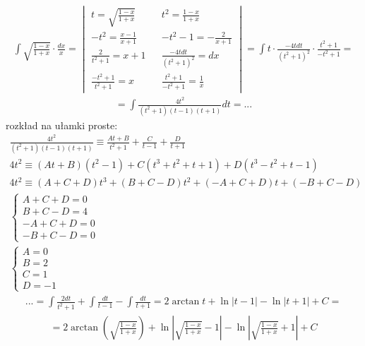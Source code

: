 
\begin{gather*}\int \sqrt{\frac{1-x}{1+x}}\cdot\frac{dx}{x} = \begin{vmatrix}
t=\sqrt{\frac{1-x}{1+x}} & & t^2=\frac{1-x}{1+x} \\
-t^2=\frac{x-1}{x+1} & & -t^2-1=-\frac{2}{x+1} \\
\frac{2}{t^2+1}=x+1 & & \frac{-4tdt}{(t^2+1)^2}=dx \\
\frac{-t^2+1}{t^2+1}=x & & \frac{t^2+1}{-t^2+1}=\frac{1}{x}
\end{vmatrix} = \int t\cdot \frac{-4tdt}{(t^2+1)^2}\cdot \frac{t^2+1}{-t^2+1} = \end{gather*}
\begin{gather*}= \int \frac{4t^2}{(t^2+1)(t-1)(t+1)}dt =...\end{gather*}
rozkład na ułamki proste:
\begin{gather*} \nonumber \frac{4t^2}{(t^2+1)(t-1)(t+1)} \equiv \frac{At+B}{t^2+1}+\frac{C}{t-1}+\frac{D}{t+1} \\
4t^2 \equiv (At+B)(t^2-1)+C(t^3+t^2+t+1)+D(t^3-t^2+t-1) \\
4t^2 \equiv (A+C+D)t^3+(B+C-D)t^2+(-A+C+D)t+(-B+C-D) \\
\begin{cases} A+C+D=0 \\ B+C-D=4 \\ -A+C+D=0 \\ -B+C-D=0 \end{cases} \\
\begin{cases} A=0 \\ B=2 \\ C=1 \\ D=-1 \end{cases}\end{gather*}
\begin{gather*} \nonumber ...=\int \frac{2dt}{t^2+1} + \int \frac{dt}{t-1} - \int \frac{dt}{t+1} = 2\arctan t + \ln|t-1|-\ln|t+1|+C = \end{gather*}
\begin{gather*}= 2\arctan \left(\sqrt{\frac{1-x}{1+x}}\right) + \ln\left|\sqrt{\frac{1-x}{1+x}}-1\right|- \ln\left|\sqrt{\frac{1-x}{1+x}}+1\right|+C\end{gather*}



